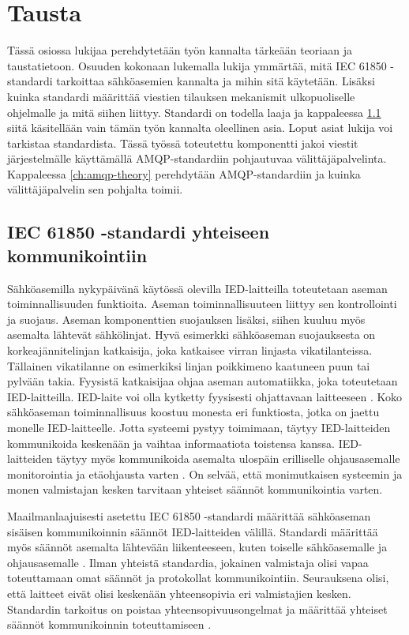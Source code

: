 \chapter{Tausta}
\label{ch:teoria}
Tässä osiossa lukijaa perehdytetään työn kannalta tärkeään teoriaan ja taustatietoon. Osuuden kokonaan lukemalla lukija ymmärtää, mitä IEC 61850 -standardi tarkoittaa sähköasemien kannalta ja mihin sitä käytetään. Lisäksi kuinka standardi määrittää viestien tilauksen mekanismit ulkopuoliselle ohjelmalle ja mitä siihen liittyy. Standardi on todella laaja ja kappaleessa \ref{ch:iec61850-theory} siitä käsitellään vain tämän työn kannalta oleellinen asia. Loput asiat lukija voi tarkistaa standardista. Tässä työssä toteutettu komponentti jakoi viestit järjestelmälle käyttämällä AMQP-standardiin pohjautuvaa välittäjäpalvelinta. Kappaleessa \ref{ch:amqp-theory} perehdytään AMQP-standardiin ja kuinka välittäjäpalvelin sen pohjalta toimii.


\section{IEC 61850 -standardi yhteiseen kommunikointiin}
\label{ch:iec61850-theory}
Sähköasemilla nykypäivänä käytössä olevilla IED-laitteilla toteutetaan aseman toiminnallisuuden funktioita. Aseman toiminnallisuuteen liittyy sen kontrollointi ja suojaus. Aseman komponenttien suojauksen lisäksi, siihen kuuluu myös asemalta lähtevät sähkölinjat. Hyvä esimerkki sähköaseman suojauksesta on korkeajännitelinjan katkaisija, joka katkaisee virran linjasta vikatilanteissa. Tällainen vikatilanne on esimerkiksi linjan poikkimeno kaatuneen puun tai pylvään takia. Fyysistä katkaisijaa ohjaa aseman automatiikka, joka toteutetaan IED-laitteilla. IED-laite voi olla kytketty fyysisesti ohjattavaan laitteeseen \mbox{\cite[s.~63--64]{IEC61850-7-1}}. Koko sähköaseman toiminnallisuus koostuu monesta eri funktiosta, jotka on jaettu monelle IED-laitteelle. Jotta systeemi pystyy toimimaan, täytyy IED-laitteiden kommunikoida keskenään ja vaihtaa informaatiota toistensa kanssa. IED-laitteiden täytyy myös kommunikoida asemalta ulospäin erilliselle ohjausasemalle monitorointia ja etäohjausta varten \mbox{\cite[s.~1]{Brunner2008}}. On selvää, että monimutkaisen systeemin ja monen valmistajan kesken tarvitaan yhteiset säännöt kommunikointia varten.

Maailmanlaajuisesti asetettu IEC 61850 -standardi määrittää sähköaseman sisäisen kommunikoinnin säännöt IED-laitteiden välillä. Standardi määrittää myös säännöt asemalta lähtevään liikenteeseen, kuten toiselle sähköasemalle ja ohjausasemalle \mbox{\cite[s.~10]{IEC61850-7-1}}. Ilman yhteistä standardia, jokainen valmistaja olisi vapaa toteuttamaan omat säännöt ja protokollat kommunikointiin. Seurauksena olisi, että laitteet eivät olisi keskenään yhteensopivia eri valmistajien kesken. Standardin tarkoitus on poistaa yhteensopivuusongelmat ja määrittää yhteiset säännöt kommunikoinnin toteuttamiseen \mbox{\cite[s.~1]{Kaneda2008}}.

